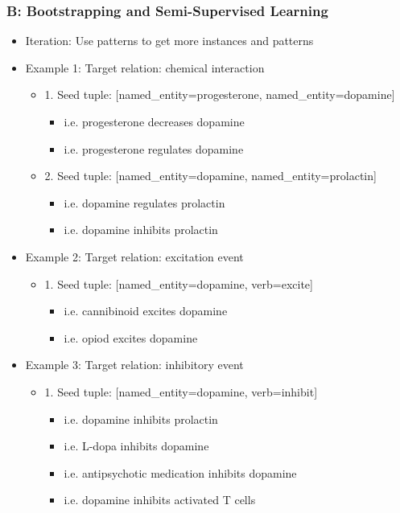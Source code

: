 \documentclass[11pt]{article}
\begin{document}
\subsubsection*{B:  Bootstrapping and Semi-Supervised Learning}
\begin{itemize}
\item Iteration: Use patterns to get more instances and patterns 
\item Example 1: Target relation: chemical interaction
	\begin{itemize}
	\item 	1. Seed tuple: [named\_entity=progesterone, named\_entity=dopamine]
		\begin{itemize}
		\item 	i.e. progesterone decreases dopamine 
		\item 	i.e. progesterone regulates dopamine
		\end{itemize}
	\item 	2. Seed tuple: [named\_entity=dopamine, named\_entity=prolactin]
		\begin{itemize}
		\item 	i.e. dopamine regulates prolactin 
		\item 	i.e. dopamine inhibits prolactin
		\end{itemize}
	\end{itemize}
\item Example 2: Target relation: excitation event
	\begin{itemize}
	\item 1.	Seed tuple: [named\_entity=dopamine, verb=excite]
		\begin{itemize}
		\item 	i.e. cannibinoid excites dopamine
		\item	i.e. opiod excites dopamine
		\end{itemize}
	\end{itemize}
\item Example 3: Target relation: inhibitory event
	\begin{itemize}
	\item 1.	Seed tuple: [named\_entity=dopamine, verb=inhibit]
		\begin{itemize}
		\item 	i.e. dopamine inhibits prolactin
		\item	i.e. L-dopa inhibits dopamine
		\item 	i.e. antipsychotic medication inhibits dopamine
		\item 	i.e. dopamine inhibits activated T cells
		\end{itemize}			

	\end{itemize}
\end{itemize}	
\end{document}
